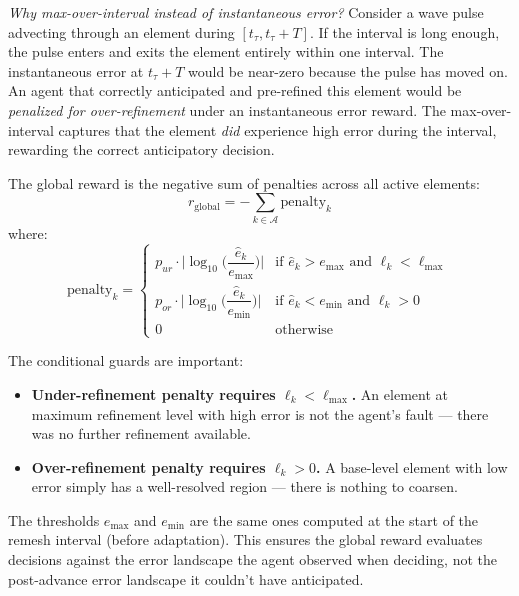 \documentclass[11pt]{article}
\begin{document}
\vspace{0.2cm}
\noindent\textit{Why max-over-interval instead of instantaneous error?} Consider a wave pulse advecting through an element during $[t_\tau, t_\tau + T]$. If the interval is long enough, the pulse enters and exits the element entirely within one interval. The instantaneous error at $t_\tau + T$ would be near-zero because the pulse has moved on. An agent that correctly anticipated and pre-refined this element would be \textit{penalized for over-refinement} under an instantaneous error reward. The max-over-interval captures that the element \textit{did} experience high error during the interval, rewarding the correct anticipatory decision.

\vspace{0.3cm}
\noindent The global reward is the negative sum of penalties across all active elements:
\begin{equation}
r_{\text{global}} = -\sum_{k \in \mathcal{A}} \text{penalty}_k
\end{equation}
where:
\begin{equation}
\text{penalty}_k = 
\begin{cases}
p_{ur} \cdot \big|\!\log_{10}\!\big(\dfrac{\hat{e}_k}{e_{\max}}\big)\big| & \text{if } \hat{e}_k > e_{\max} \text{ and } \ell_k < \ell_{\max} \\[10pt]
p_{or} \cdot \big|\!\log_{10}\!\big(\dfrac{\hat{e}_k}{e_{\min}}\big)\big| & \text{if } \hat{e}_k < e_{\min} \text{ and } \ell_k > 0 \\[10pt]
0 & \text{otherwise}
\end{cases}
\end{equation}

\noindent The conditional guards are important:
\begin{itemize}[leftmargin=1.5em, itemsep=3pt]
    \item \textbf{Under-refinement penalty requires $\ell_k < \ell_{\max}$.} An element at maximum refinement level with high error is not the agent's fault --- there was no further refinement available.
    \item \textbf{Over-refinement penalty requires $\ell_k > 0$.} A base-level element with low error simply has a well-resolved region --- there is nothing to coarsen.
\end{itemize}

\noindent The thresholds $e_{\max}$ and $e_{\min}$ are the same ones computed at the start of the remesh interval (before adaptation). This ensures the global reward evaluates decisions against the error landscape the agent observed when deciding, not the post-advance error landscape it couldn't have anticipated.
\end{document}
